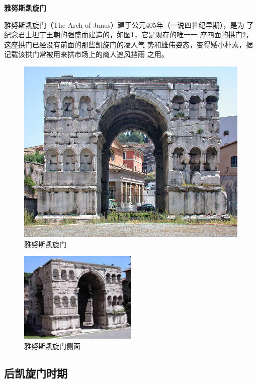 \documentclass[a4paper,dvipdfm]{article}
\begin{document}
\textbf{雅努斯凯旋门}

雅努斯凯旋门（The Arch of Janus）建于公元405年（一说四世纪早期），是为
了纪念君士坦丁王朝的强盛而建造的，如图\ref{fig:janus}，它是现存的唯一一
座四面的拱门\ref{fig:janusl}，这座拱门已经没有前面的那些凯旋门的凌人气
势和雄伟姿态，变得矮小朴素，据记载该拱门常被用来拱市场上的商人遮风挡雨
之用。

\begin{figure}[hbt!]
  \centering
  \includegraphics[width=\textwidth]{Arch_of_Janus}
  \caption{雅努斯凯旋门}
  \label{fig:janus}
\end{figure}

\begin{figure}[hbt!]
  \centering
  \includegraphics[width=0.5\textwidth]{arch_of_janus_left}
  \caption{雅努斯凯旋门侧面}
  \label{fig:janusl}
\end{figure}

\subsection{后凯旋门时期}
\end{document}

